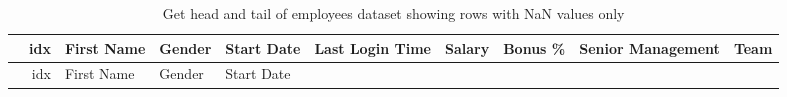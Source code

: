 \documentclass [oneside,10pt,a4paper,ngerman,BCOR10mm,headsepline,parindent,final]{scrartcl}
\begin{document}
    \begin{longtable}[]{@{}rrllllrrrl@{}}
\caption{Get head and tail of employees dataset showing rows with NaN
values only}\tabularnewline
\toprule
\begin{minipage}[b]{0.03\columnwidth}\raggedleft
\strut
\end{minipage} & \begin{minipage}[b]{0.04\columnwidth}\raggedleft
idx\strut
\end{minipage} & \begin{minipage}[b]{0.08\columnwidth}\raggedright
First Name\strut
\end{minipage} & \begin{minipage}[b]{0.06\columnwidth}\raggedright
Gender\strut
\end{minipage} & \begin{minipage}[b]{0.08\columnwidth}\raggedright
Start Date\strut
\end{minipage} & \begin{minipage}[b]{0.11\columnwidth}\raggedright
Last Login Time\strut
\end{minipage} & \begin{minipage}[b]{0.06\columnwidth}\raggedleft
Salary\strut
\end{minipage} & \begin{minipage}[b]{0.06\columnwidth}\raggedleft
Bonus \%\strut
\end{minipage} & \begin{minipage}[b]{0.12\columnwidth}\raggedleft
Senior Management\strut
\end{minipage} & \begin{minipage}[b]{0.08\columnwidth}\raggedright
Team\strut
\end{minipage}\tabularnewline
\midrule
\endfirsthead
\toprule
\begin{minipage}[b]{0.03\columnwidth}\raggedleft
\strut
\end{minipage} & \begin{minipage}[b]{0.04\columnwidth}\raggedleft
idx\strut
\end{minipage} & \begin{minipage}[b]{0.08\columnwidth}\raggedright
First Name\strut
\end{minipage} & \begin{minipage}[b]{0.06\columnwidth}\raggedright
Gender\strut
\end{minipage} & \begin{minipage}[b]{0.08\columnwidth}\raggedright
Start Date\strut
\end{minipage} & \begin{minipage}[b]{0.11\columnwidth}\raggedright

\end{minipage}
\end{longtable}
\end{document}
